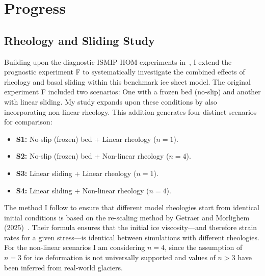 \chapter{Progress}\label{progress}
\section{Rheology and Sliding Study}\label{study1}
Building upon the diagnostic ISMIP-HOM experiments in~\cite{Pattyn_2008}, I extend the prognostic experiment F to systematically investigate the combined effects of rheology and basal sliding within this benchmark ice sheet model. The original experiment F included two scenarios: One with a frozen bed (no-slip) and another with linear sliding.
My study expands upon these conditions by also incorporating non-linear rheology. This addition generates four distinct scenarios for comparison:
\begin{itemize}
\item{\bf{S1}:} No-slip (frozen) bed + Linear rheology ($n=1$).
\item{\bf{S2}:} No-slip (frozen) bed + Non-linear rheology ($n=4$).
\item{\bf{S3}:} Linear sliding + Linear rheology ($n=1$).
\item{\bf{S4}:} Linear sliding + Non-linear rheology ($n=4$).
\end{itemize}
The method I follow to ensure that different model rheologies start from identical initial conditions is based on the re-scaling method by Getraer and Morlighem (2025)~\cite{Getraer_2025}. Their formula ensures that the initial ice viscosity—and therefore strain rates for a given stress—is identical between simulations with different rheologies.
For the non-linear scenarios I am considering $n = 4$, since the assumption of $n = 3$ for ice deformation is not universally supported and values of $n > 3$ have been inferred from real‐world glaciers.
